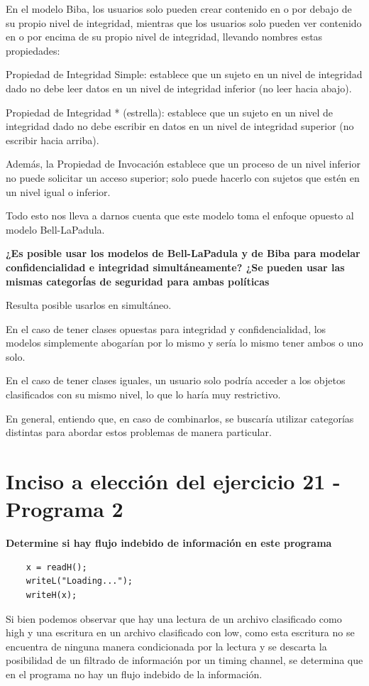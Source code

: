 \documentclass[11pt]{article}
\begin{document}
En el modelo Biba, los usuarios solo pueden crear contenido en o por debajo de su propio nivel de integridad, mientras que los usuarios solo pueden ver contenido en o por encima de su propio nivel de integridad, llevando nombres estas propiedades:

Propiedad de Integridad Simple: establece que un sujeto en un nivel de integridad dado no debe leer datos en un nivel de integridad inferior (no leer hacia abajo).

Propiedad de Integridad * (estrella): establece que un sujeto en un nivel de integridad dado no debe escribir en datos en un nivel de integridad superior (no escribir hacia arriba).

Además, la Propiedad de Invocación establece que un proceso de un nivel inferior no puede solicitar un acceso superior; solo puede hacerlo con sujetos que estén en un nivel igual o inferior.

Todo esto nos lleva a darnos cuenta que este modelo toma el enfoque opuesto al modelo Bell-LaPadula.

\textbf{¿Es posible usar los modelos de Bell-LaPadula y de Biba para modelar confidencialidad e
integridad simultáneamente? ¿Se pueden usar las mismas categorĺas de seguridad para ambas
políticas}

Resulta posible usarlos en simultáneo. 

En el caso de tener clases opuestas para integridad y confidencialidad, los modelos simplemente abogarían por lo mismo y sería lo mismo tener ambos o uno solo. 

En el caso de tener clases iguales, un usuario solo podría acceder a los objetos clasificados con su mismo nivel, lo que lo haría muy restrictivo. 

En general, entiendo que, en caso de combinarlos, se buscaría utilizar categorías distintas para abordar estos problemas de manera particular.

\section*{Inciso a elección del ejercicio 21 - Programa 2}

\textbf{Determine si hay flujo indebido de información en este programa}

\begin{lstlisting}
    x = readH();
    writeL("Loading...");
    writeH(x);
\end{lstlisting}

Si bien podemos observar que hay una lectura de un archivo clasificado como high y una escritura en un archivo clasificado con low, 
como esta escritura no se encuentra de ninguna manera condicionada por la lectura y se descarta la posibilidad de un filtrado de información 
por un timing channel, se determina que en el programa no hay un flujo indebido de la información.
\end{document}
